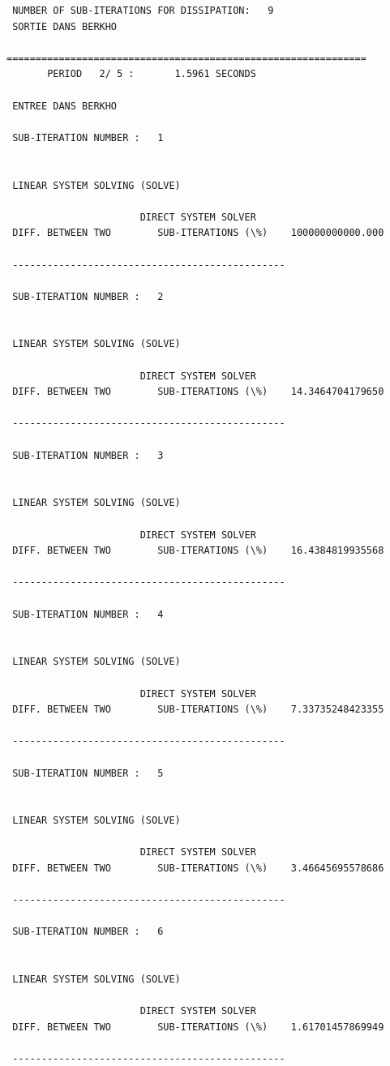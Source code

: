 \begin{verbatim}
 NUMBER OF SUB-ITERATIONS FOR DISSIPATION:   9
 SORTIE DANS BERKHO

==============================================================
       PERIOD   2/ 5 :       1.5961 SECONDS

 ENTREE DANS BERKHO

 SUB-ITERATION NUMBER :   1


 LINEAR SYSTEM SOLVING (SOLVE)

                       DIRECT SYSTEM SOLVER
 DIFF. BETWEEN TWO        SUB-ITERATIONS (\%)    100000000000.000

 -----------------------------------------------

 SUB-ITERATION NUMBER :   2


 LINEAR SYSTEM SOLVING (SOLVE)

                       DIRECT SYSTEM SOLVER
 DIFF. BETWEEN TWO        SUB-ITERATIONS (\%)    14.3464704179650

 -----------------------------------------------

 SUB-ITERATION NUMBER :   3


 LINEAR SYSTEM SOLVING (SOLVE)

                       DIRECT SYSTEM SOLVER
 DIFF. BETWEEN TWO        SUB-ITERATIONS (\%)    16.4384819935568

 -----------------------------------------------

 SUB-ITERATION NUMBER :   4


 LINEAR SYSTEM SOLVING (SOLVE)

                       DIRECT SYSTEM SOLVER
 DIFF. BETWEEN TWO        SUB-ITERATIONS (\%)    7.33735248423355

 -----------------------------------------------

 SUB-ITERATION NUMBER :   5


 LINEAR SYSTEM SOLVING (SOLVE)

                       DIRECT SYSTEM SOLVER
 DIFF. BETWEEN TWO        SUB-ITERATIONS (\%)    3.46645695578686

 -----------------------------------------------

 SUB-ITERATION NUMBER :   6


 LINEAR SYSTEM SOLVING (SOLVE)

                       DIRECT SYSTEM SOLVER
 DIFF. BETWEEN TWO        SUB-ITERATIONS (\%)    1.61701457869949

 -----------------------------------------------


\end{verbatim}
